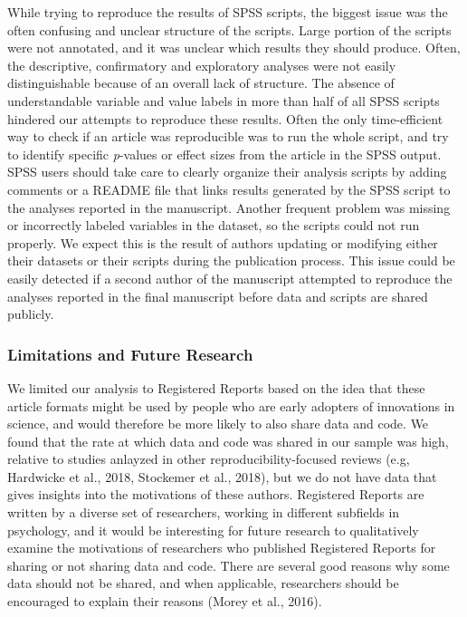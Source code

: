 \documentclass[
  ,jou, a4paper,floatsintext]{apa6}
\begin{document}
While trying to reproduce the results of SPSS scripts, the biggest issue was the often confusing and unclear structure of the scripts. Large portion of the scripts were not annotated, and it was unclear which results they should produce. Often, the descriptive, confirmatory and exploratory analyses were not easily distinguishable because of an overall lack of structure. The absence of understandable variable and value labels in more than half of all SPSS scripts hindered our attempts to reproduce these results. Often the only time-efficient way to check if an article was reproducible was to run the whole script, and try to identify specific \emph{p}-values or effect sizes from the article in the SPSS output. SPSS users should take care to clearly organize their analysis scripts by adding comments or a README file that links results generated by the SPSS script to the analyses reported in the manuscript. Another frequent problem was missing or incorrectly labeled variables in the dataset, so the scripts could not run properly. We expect this is the result of authors updating or modifying either their datasets or their scripts during the publication process. This issue could be easily detected if a second author of the manuscript attempted to reproduce the analyses reported in the final manuscript before data and scripts are shared publicly.

\hypertarget{limitations-and-future-research}{%
\subsubsection{Limitations and Future Research}\label{limitations-and-future-research}}

We limited our analysis to Registered Reports based on the idea that these article formats might be used by people who are early adopters of innovations in science, and would therefore be more likely to also share data and code. We found that the rate at which data and code was shared in our sample was high, relative to studies anlayzed in other reproducibility-focused reviews (e.g, Hardwicke et al., 2018, Stockemer et al., 2018), but we do not have data that gives insights into the motivations of these authors. Registered Reports are written by a diverse set of researchers, working in different subfields in psychology, and it would be interesting for future research to qualitatively examine the motivations of researchers who published Registered Reports for sharing or not sharing data and code. There are several good reasons why some data should not be shared, and when applicable, researchers should be encouraged to explain their reasons (Morey et al., 2016).
\end{document}
